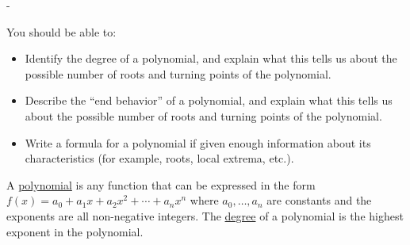 \documentclass{article}
\makeatletter
\newlength{\tipmargin}
\renewenvironment{framed}{
  \setlength{\tipmargin}{\textwidth-\linewidth}
  \advance\@totalleftmargin-\tipmargin
  \def\FrameCommand{\hspace{\tipmargin}\fbox}%
  \advance\linewidth\tipmargin
  \MakeFramed {\advance\hsize-\width \FrameRestore}%
}
{\endMakeFramed}
\makeatother
\begin{document}

\begin{problemonly}
  \begin{framed}

You should be able to:
    \begin{itemize}[topsep=0pt,partopsep=0pt,parsep=8pt,itemsep=0pt]
    \item Identify the degree of a polynomial, and explain what this tells us about the possible number of roots and turning points of the polynomial. 

    \item Describe the ``end behavior'' of a polynomial, and explain what this tells us about the possible number of roots and turning points of the polynomial.

    \item Write a formula for a polynomial if given enough information about its characteristics (for example, roots, local extrema, etc.).

    \end{itemize}
  \end{framed}
\end{problemonly}

A \uline{polynomial} is any function that can be expressed in the form $f(x) = a_0 + a_1 x + a_2 x^2 + \cdots + a_n x^n$ where $a_0, \ldots, a_n$ are constants and the exponents are all non-negative integers. The \uline{degree} of a polynomial is the highest exponent in the polynomial.
\end{document}
